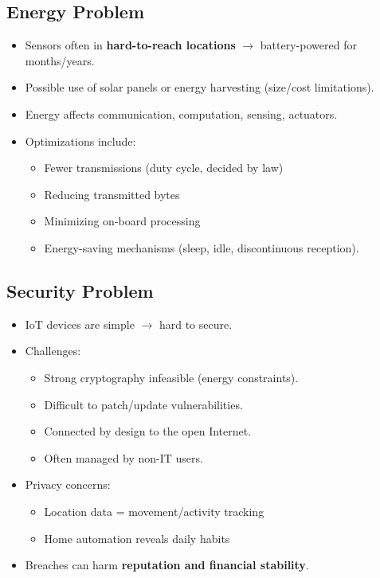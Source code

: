 \subsection{Energy Problem}

\begin{itemize}
    \item Sensors often in \textbf{hard-to-reach locations} $\rightarrow$ battery-powered for months/years.
    \item Possible use of solar panels or energy harvesting (size/cost limitations).
    \item Energy affects communication, computation, sensing, actuators.
    \item Optimizations include:
    \begin{itemize}
        \item Fewer transmissions (duty cycle, decided by law)
        \item Reducing transmitted bytes
        \item Minimizing on-board processing
        \item Energy-saving mechanisms (sleep, idle, discontinuous reception).
    \end{itemize}
\end{itemize}

\subsection{Security Problem}

\begin{itemize}
    \item IoT devices are simple $\rightarrow$ hard to secure.
    \item Challenges:
    \begin{itemize}
        \item Strong cryptography infeasible (energy constraints).
        \item Difficult to patch/update vulnerabilities.
        \item Connected by design to the open Internet.
        \item Often managed by non-IT users.
    \end{itemize}
    \item Privacy concerns:
    \begin{itemize}
        \item Location data = movement/activity tracking
        \item Home automation reveals daily habits
    \end{itemize}
    \item Breaches can harm \textbf{reputation and financial stability}.
\end{itemize}

